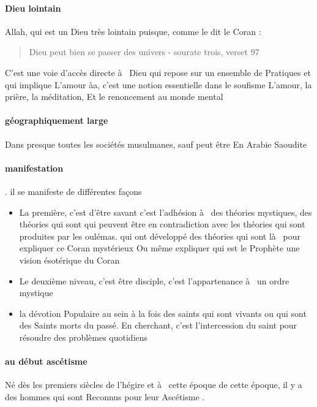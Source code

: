 \paragraph{Dieu lointain } Allah, qui  est un Dieu très lointain puisque, comme le dit le Coran :
\begin{quote}
    Dieu peut bien se passer des univers  - sourate trois, verset 97 
\end{quote}
 
\begin{Def}[soufisme]
    C'est une voie d'accès directe à  Dieu qui  repose sur un ensemble de 
Pratiques et qui  implique 
L'amour  àa, c'est une notion essentielle dans le soufisme 
L'amour, la prière, la méditation, 
Et le renoncement au monde mental
\end{Def}
 
 \paragraph{géographiquement large}
Dans presque toutes les sociétés musulmanes, sauf peut être 
En Arabie Saoudite  

\paragraph{manifestation}
 . il se manifeste de différentes façons 
\begin{itemize}
    \item La première, c'est d'être savant c'est l'adhésion à  des théories mystiques,  des théories qui  sont 
qui  peuvent être en contradiction 
avec les théories qui  sont produites par les oulémas. qui  ont développé des théories qui  sont là  pour expliquer 
ce Coran mystérieux 
Ou même expliquer qui  est le 
Prophète   une vision ésotérique 
du Coran 
\item Le deuxième niveau, c'est être disciple, c'est l'appartenance à  un ordre mystique
\item la dévotion 
Populaire au sein 
à  la fois des saints qui  sont vivants ou qui  sont des 
Saints morts du passé.  En cherchant, c'est l'intercession du saint pour résoudre des problèmes quotidiens 
\end{itemize}


\paragraph{au début ascétisme}   
Né dès les premiers siècles de l'hégire et à  cette époque de cette époque, il y a des hommes qui  sont 
Reconnus pour leur 
Ascétisme . 

